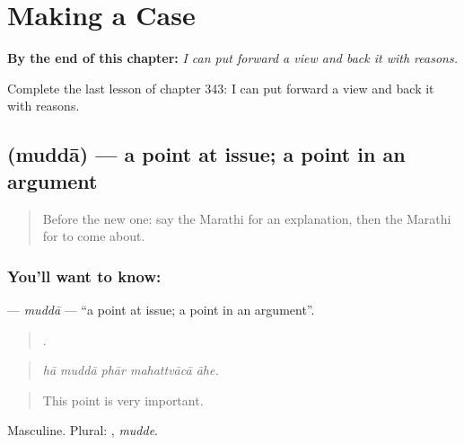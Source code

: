 
\chapter{Making a Case}
\label{ch:mr-making-a-case}

\begin{chapteropening}
\textbf{By the end of this chapter:} \emph{I can put forward a view and back it with reasons.}

Complete the last lesson of chapter 343: I can put forward a view and back it with reasons.
\end{chapteropening}

\section[\texorpdfstring{\mr{मुद्दा} (muddā)}{मुद्दा (muddā)}]{ (muddā) — a point at issue; a point in an argument}

\label{lesson:MR-C343-mudda}



\begin{quote}
Before the new one: say the Marathi for an explanation, then the Marathi for to come about.
\end{quote}

\subsection*{You'll want to know: }
\textbf{} — \emph{muddā} — \textquotedblleft{}a point at issue; a point in an argument\textquotedblright{}.

\begin{quote}
    .
\end{quote}

\begin{quote}
\emph{hā muddā phār mahattvācā āhe.}
\end{quote}

\begin{quote}
This point is very important.
\end{quote}

Masculine. Plural: , \emph{mudde}.

